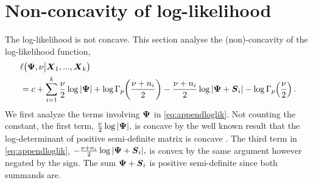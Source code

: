 \documentclass{article}\usepackage[]{graphicx}\usepackage[]{color}
\begin{document}
\section{Non-concavity of log-likelihood}
\label{sec:concaveloglik}
The log-likelihood is not concave.
This section analyse the (non)-concavity of the log-likelihood function,
\small
\begin{align}
  &\ell\!\left(\vPsi, \nu \big| \vX_1, ..., \vX_k \right) \notag \\
  &= c + \sum_{i=1}^k
            \frac{\nu}{2}  \log |\vPsi|
            + \log \Gamma_p\!\left(\frac{\nu + n_i}{2}\right)  %
           - \frac{\nu + n_i}{2}\log|\vPsi +\vS_i|
            - \log \Gamma_p\!\left(\frac{\nu}{2}\right).
            \label{eq:appendloglik}
\end{align}
\normalsize
We first analyze the terms involving ${\boldsymbol{\Psi}}$ in \eqref{eq:appendloglik}. Not counting the constant, the first term,
$
  \frac{\nu}{2}  \log | {\boldsymbol{\Psi}} |,
$
is concave by the well known result that the log-determinant of positive semi-definite matrix is concave \citep[See e.g.][pp. 73-74]{Boyd2004}.
The third term in \eqref{eq:appendloglik},
$
  - \frac{\nu + n_i}{2}\log|{\boldsymbol{\Psi}} + {\boldsymbol{S}}_i|,
$
is convex by the same argument however negated by the sign.
The sum ${\boldsymbol{\Psi}} +{\boldsymbol{S}}_i$ is positive semi-definite since both summands are.
\end{document}
